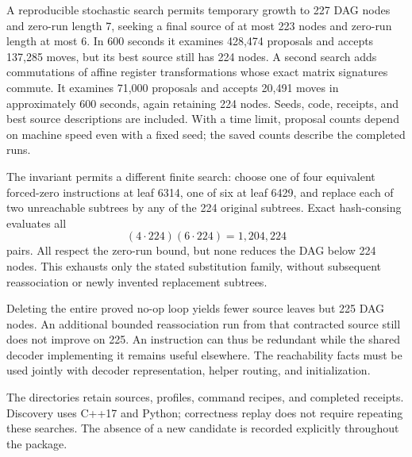 A reproducible stochastic search permits temporary growth to 227 DAG nodes
and zero-run length 7, seeking a final source of at most 223 nodes and zero-run
length at most 6. In 600 seconds it examines 428,474 proposals and accepts
137,285 moves, but its best source still has 224 nodes. A second search adds
commutations of affine register transformations whose exact matrix signatures
commute. It examines 71,000 proposals and accepts 20,491 moves in approximately
600 seconds, again retaining 224 nodes. Seeds, code, receipts, and best source
descriptions are included. With a time limit, proposal counts depend on machine
speed even with a fixed seed; the saved counts describe the completed runs.

The invariant permits a different finite search: choose one of four equivalent
forced-zero instructions at leaf 6314, one of six at leaf 6429, and replace
each of two unreachable subtrees by any of the 224 original subtrees. Exact
hash-consing evaluates all
\[
 (4\cdot224)(6\cdot224)=1,204,224
\]
pairs. All respect the zero-run bound, but none reduces the DAG below 224
nodes. This exhausts only the stated substitution family, without subsequent
reassociation or newly invented replacement subtrees.

Deleting the entire proved no-op loop yields fewer source leaves but 225 DAG
nodes. An additional bounded reassociation run from that contracted source
still does not improve on 225. An instruction can thus be redundant while
the shared decoder implementing it remains useful elsewhere. The reachability
facts must be used jointly with decoder representation, helper routing, and
initialization.

The  directories retain sources, profiles, command recipes,
and completed receipts. Discovery uses C++17 and Python; correctness replay
does not require repeating these searches. The absence of a new candidate
is recorded explicitly throughout the package.
